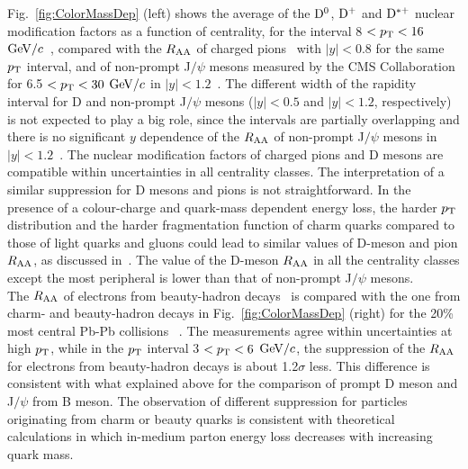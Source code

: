 Fig.~\ref{fig:ColorMassDep} (left) shows the average of the ${\rm D^0}$, ${\rm D^+}$ and ${\rm D^{*+}}$ 
nuclear modification factors as a function of centrality, for the interval 8 $< p_{\rm T} < 16$ $\mathrm{GeV}/c$~\cite{Adam:2015nna}, 
compared with the $R_{\rm AA}$ of charged pions~\cite{Abelev:2014laa} with $|y| < 0.8$ for the same $p_{\rm T}$ interval, 
and of non-prompt J$/\psi$ mesons measured by the CMS Collaboration for 6.5 $< p_{\rm T} < 30$ $\mathrm{GeV}/c$ 
in $|y| < 1.2$~\cite{Khachatryan:2016ypw}. The different width of the rapidity interval for D and non-prompt
J$/\psi$ mesons ($|y| < 0.5$ and $|y| < 1.2$, respectively) is not expected to play a big role, since
the intervals are partially overlapping and there is no significant $y$ dependence of the $R_{\rm AA}$ of 
non-prompt J$/\psi$ mesons in $|y| < 1.2$~\cite{Khachatryan:2016ypw}. The nuclear modification 
factors of charged pions and D mesons are compatible within uncertainties
in all centrality classes. The interpretation of a similar suppression for D mesons and pions is not
straightforward. In the presence of a colour-charge and quark-mass dependent 
energy loss, the harder $p_{\rm T}$ distribution and the harder fragmentation function of 
charm quarks compared to those of light quarks and gluons could lead to similar 
values of D-meson and pion $R_{\rm AA}$, as discussed in~\cite{Djordjevic:2013pba}. 
The value of the D-meson $R_{\rm AA}$ in all the centrality
classes except the most peripheral is lower than that of non-prompt J$/\psi$ mesons. \\
The $R_{\rm AA}$ of electrons from beauty-hadron decays~\cite{Adam:2016wyz} is compared with the one from charm- and
beauty-hadron decays in Fig.~\ref{fig:ColorMassDep} (right) for the 20\% most central Pb-Pb collisions
~\cite{Adam:2016khe}. The measurements agree within uncertainties at high $p_{\rm T}$, while in the $p_{\rm T}$ 
interval 3 $< p_{\rm T} < 6$ $\mathrm{GeV}/c$, the suppression of the $R_{\rm AA}$ for electrons from beauty-hadron decays 
is about 1.2$\sigma$ less. This difference is consistent with what explained above for the comparison of prompt D meson 
and J$/\psi$ from B meson. The observation of different suppression for particles originating from
charm or beauty quarks is consistent with theoretical calculations in which in-medium parton energy loss 
decreases with increasing quark mass.
